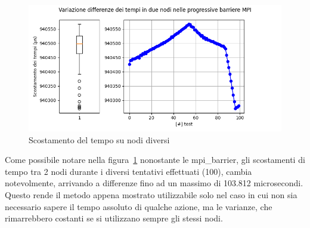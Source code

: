 \begin{figure}[H]
    \centering
    \includegraphics[width=\textwidth]{./results/time_sync_node.png}
    \caption{Scostamento del tempo su nodi diversi}\label{fig:sync_time_shift1}
\end{figure}

Come possibile notare nella figura~\ref{fig:sync_time_shift1} nonostante le mpi\_barrier, gli scostamenti di tempo tra 2 nodi durante i diversi tentativi effettuati (100), cambia notevolmente, arrivando a differenze fino ad un massimo di 103.812 microsecondi. Questo rende il metodo appena mostrato utilizzabile solo nel caso in cui non sia necessario sapere il tempo assoluto di qualche azione, ma le varianze, che rimarrebbero costanti se si utilizzano sempre gli stessi nodi.
